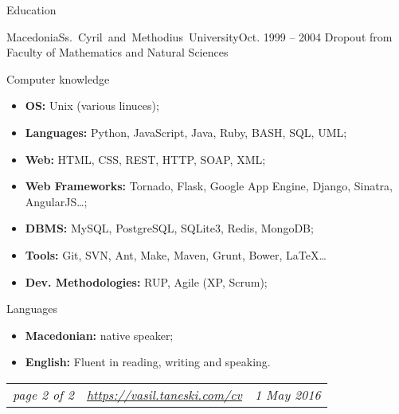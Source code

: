\documentclass[]{mcdowellcv}
\begin{document}
    \begin{cvsection}{Education}
    \label{Education}
        \begin{cvsubsection}{Macedonia}{\mbox{Ss. Cyril and Methodius University}}{Oct. 1999 -- 2004}
            Dropout from Faculty of Mathematics and Natural Sciences
        \end{cvsubsection}
    \end{cvsection}

    \begin{cvsection}{Computer knowledge}
    \label{Computer knowledge}
        \begin{cvsubsection}{}{}{}
            \begin{itemize}
                \item \textbf{OS:} Unix (various linuces);
                \item \textbf{Languages:} Python, JavaScript, Java, Ruby, BASH, SQL, UML;
                \vspace{1mm}
                \item \textbf{Web:} HTML, CSS, REST, HTTP, SOAP, XML;
                \item \textbf{Web Frameworks:} Tornado, Flask, Google App Engine, Django, Sinatra, AngularJS\ldots;
                \vspace{1mm}
                \item \textbf{DBMS:} MySQL, PostgreSQL, SQLite3, Redis, MongoDB;
                \item \textbf{Tools:} Git, SVN, Ant, Make, Maven, Grunt, Bower, \LaTeX\ldots
                \vspace{1mm}
                \item \textbf{Dev. Methodologies:} RUP, Agile (XP, Scrum);
            \end{itemize}
        \end{cvsubsection}
    \end{cvsection}

    \begin{cvsection}{Languages}
    \label{Languages}
        \begin{cvsubsection}{}{}{}
            \begin{itemize}
                \item \textbf{Macedonian:} native speaker;
                \item \textbf{English:} Fluent in reading, writing and speaking.
            \end{itemize}
        \end{cvsubsection}
    \end{cvsection}
    \vfill
    \begin{tabu} to 1\textwidth {X[l,m] X[c,m] X[r,m]}
        \textit{page 2 of 2} &
        \textit{\url{https://vasil.taneski.com/cv}} &
        \textit{1 May 2016}
    \end{tabu}
    \clearpage
\end{document}
